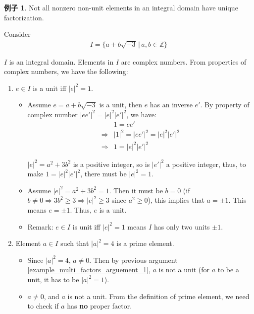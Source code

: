 \documentclass[utf8]{ctexbook}
\theoremstyle{definition}
\newtheorem{example}{例子}[section]
\begin{document}
\begin{example}\label{example_unique_factorization_multi_factors}
Not all nonzero non-unit elements in an integral domain have unique factorization.

Consider
\begin{align*}
I = \{ a + b \sqrt{-3} \, |\, a, b \in \mathbb{Z} \}
\end{align*}

$I$ is an integral domain. Elements in $I$ are complex numbers. From properties of complex numbers, we have the following:
\begin{enumerate}
\item{$e \in I$ is a unit iff $|e|^2 = 1$. \label{example_multi_factors_arguement_1}}

\begin{itemize}
\item{Assume $e = a + b \sqrt{-3}$ is a unit, then $e$ has an inverse $e'$. By property of complex number $|e e'|^2 = |e|^2 |e'|^2$, we have:
\begin{align*}
& 1 = e e' \\
\Longrightarrow & |1 |^2 = |e e'|^2 =  |e|^2 |e'|^2 \\
\Longrightarrow & 1 = |e|^2 |e'|^2
\end{align*}

$|e|^2 = a^2 + 3 b^2$ is a positive integer, so is $|e'|^2$ a positive integer, thus, to make $1 = |e|^2 |e'|^2$, there must be $|e|^2 =1 $.
}
\item{Assume $|e|^2 = a^2 + 3 b^2 = 1$. Then it must be $b = 0$ (if $b \neq 0  \Longrightarrow 3b^2 \geq 3 \Longrightarrow |e|^2 \geq 3$ since $a^2 \geq 0$), this implies that $a = \pm 1$. This means $e = \pm 1 $. Thus, $e$ is a unit.}
\item{Remark: $e \in I$ is unit iff $|e|^2 = 1$ means $I$ has only two units $\pm 1$.}
\end{itemize}


\item{Element $a \in I$ such that $|a|^2 = 4$ is a prime element.\label{example_multi_factors_arguement_2}}

\begin{itemize}
\item{Since $|a|^2 = 4$, $a \neq 0$. Then by previous argument \ref{example_multi_factors_arguement_1}, $a$ is not a unit (for $a$ to be a unit, it has to be $|a|^2 = 1$). }
\item{$a \neq 0$, and $a$ is not a unit. From the definition of prime element, we need to check if $a$ has \textbf{no} proper factor.

}
\end{itemize}
\end{enumerate}
\end{example}
\end{document}
